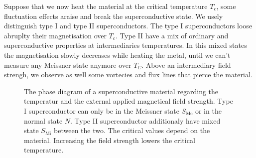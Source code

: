 \documentclass[../main.tex]{subfile}
\begin{document}
Suppose that we now heat the material at the critical temperature $T_c$, some fluctuation effects araise and break the superconductive state.
We usely distinguish type I and type II superconductors. The type I superconductors
loose abruplty their magnetisation over $T_c$. Type II have a mix of ordinary and superconductive properties at intermediaries temperatures. In this mixed states the magnetisation slowly decreases while heating the metal,
 until we can't measure any Meissner state anymore over $T_C$. Above an intermediary field strengh, we observe as well some vortecies and flux lines that pierce the material.\\
 \begin{figure}[H]\centering

    
        \caption{The phase diagram of a superconductive material regarding the temperatur and the external applied magnetical field strength. Type I superconductor can only be in 
        the Meissner state $S_{\text{Me}}$ or in the normal state $N$. Type II superconductor additionaly have mixed state $S_{\text{Mi}}$ between the two. The critical values depend on the material.
        Increasing the field strength lowers the critical temperature.}
    \end{figure}
 
\end{document}
